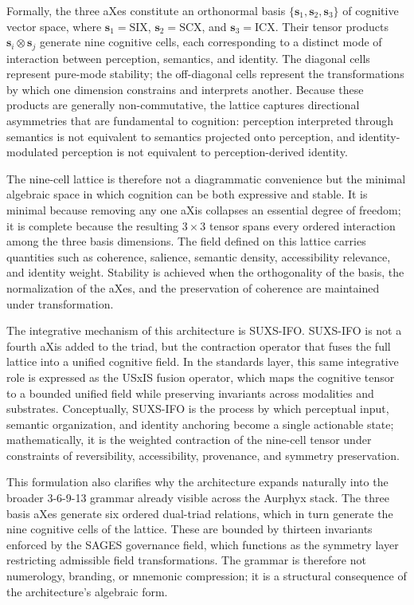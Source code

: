 Formally, the three aXes constitute an orthonormal basis
\(\{\mathbf{s}_1, \mathbf{s}_2, \mathbf{s}_3\}\) of cognitive vector space, where
\(\mathbf{s}_1 = \mathrm{SIX}\), \(\mathbf{s}_2 = \mathrm{SCX}\), and
\(\mathbf{s}_3 = \mathrm{ICX}\). Their tensor products \(\mathbf{s}_i \otimes
\mathbf{s}_j\) generate nine cognitive cells, each corresponding to a distinct mode
of interaction between perception, semantics, and identity. The diagonal cells
represent pure-mode stability; the off-diagonal cells represent the transformations
by which one dimension constrains and interprets another. Because these products are
generally non-commutative, the lattice captures directional asymmetries that are
fundamental to cognition: perception interpreted through semantics is not equivalent
to semantics projected onto perception, and identity-modulated perception is not
equivalent to perception-derived identity.

The nine-cell lattice is therefore not a diagrammatic convenience but the minimal
algebraic space in which cognition can be both expressive and stable. It is minimal
because removing any one aXis collapses an essential degree of freedom; it is
complete because the resulting \(3 \times 3\) tensor spans every ordered interaction
among the three basis dimensions. The field defined on this lattice carries
quantities such as coherence, salience, semantic density, accessibility relevance,
and identity weight. Stability is achieved when the orthogonality of the basis, the
normalization of the aXes, and the preservation of coherence are maintained
under transformation.

The integrative mechanism of this architecture is SUXS-IFO. SUXS-IFO is not a fourth
aXis added to the triad, but the contraction operator that fuses the full lattice
into a unified cognitive field. In the standards layer, this same integrative role
is expressed as the USxIS fusion operator, which maps the cognitive tensor to a
bounded unified field while preserving invariants across modalities and substrates.
Conceptually, SUXS-IFO is the process by which perceptual input, semantic organization,
and identity anchoring become a single actionable state; mathematically, it is the
weighted contraction of the nine-cell tensor under constraints of reversibility,
accessibility, provenance, and symmetry preservation.

This formulation also clarifies why the architecture expands naturally into the
broader 3-6-9-13 grammar already visible across the Aurphyx stack. The three basis
aXes generate six ordered dual-triad relations, which in turn generate the nine
cognitive cells of the lattice. These are bounded by thirteen invariants enforced by
the SAGES governance field, which functions as the symmetry layer restricting
admissible field transformations. The grammar is therefore not numerology, branding,
or mnemonic compression; it is a structural consequence of the architecture's
algebraic form.

